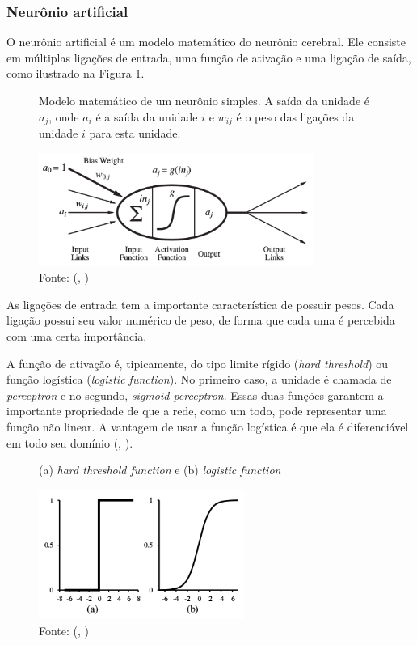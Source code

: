 \documentclass[]{politex}
\begin{document}
\subsubsection{Neurônio artificial}
O neurônio artificial é um modelo matemático do neurônio cerebral. Ele consiste em múltiplas ligações de entrada, uma função de ativação e uma ligação de saída, como ilustrado na Figura \ref{fig:neuronio}.

\begin{figure}[H]
    \centering
    \caption{Modelo matemático de um neurônio simples. A saída da unidade é \(a_j\), onde \(a_i\) é a saída da unidade \(i\) e \(w_{ij}\) é o peso das ligações da unidade \(i\) para esta unidade.}
    \includegraphics[width=0.8\textwidth]{Neuronio}
    \caption*{Fonte: (, \citeyear{Russell})}
    \label{fig:neuronio}
\end{figure}

As ligações de entrada tem a importante característica de possuir pesos. Cada ligação possui seu valor numérico de peso, de forma que cada uma é percebida com uma certa importância.

A função de ativação é, tipicamente, do tipo limite rígido (\textit{hard threshold}) ou função logística (\textit{logistic function}). No primeiro caso, a unidade é chamada de \textit{perceptron} e no segundo, \textit{sigmoid perceptron}. Essas duas funções garantem a importante propriedade de que a rede, como um todo, pode representar uma função não linear. A vantagem de usar a função logística é que ela é diferenciável em todo seu domínio (, \citeyear{Russell}).

\begin{figure}[H]
    \centering
    \caption{(a) \textit{hard threshold function} e (b)\textit{ logistic function}}
    \includegraphics[width=0.6\textwidth]{funcativacao}
    \caption*{Fonte: (, \citeyear{Russell})}
    \label{fig:funcativacao}
\end{figure}
\end{document}
